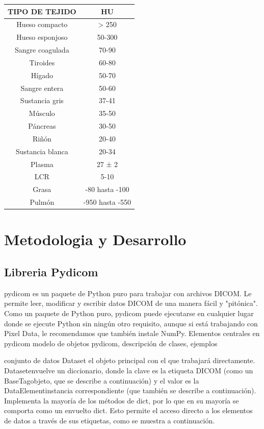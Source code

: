 \documentclass{article}
\begin{document}
\begin{table}[H]
\begin{center}
\begin{tabular}{| c | c |}
\hline
TIPO DE TEJIDO & HU \\ \hline
Hueso compacto & > 250 \\
Hueso esponjoso & 50-300 \\
Sangre coagulada & 70-90 \\
Tiroides & 60-80\\
Hígado & 50-70\\
Sangre entera & 50-60\\
Sustancia gris & 37-41\\
Músculo & 35-50\\
Páncreas & 30-50\\
Riñón & 20-40\\
Sustancia blanca & 20-34\\
Plasma & 27 ± 2\\
LCR & 5-10\\
Grasa & -80 hasta -100\\
Pulmón & -950 hasta -550\\ \hline
\end{tabular}
\end{center}
\end{table}


\section{Metodologia y Desarrollo}

\subsection{Libreria Pydicom}
pydicom es un paquete de Python puro para trabajar con archivos DICOM. Le permite leer, modificar y escribir datos DICOM de una manera fácil y "pitónica".
Como un paquete de Python puro, pydicom puede ejecutarse en cualquier lugar donde se ejecute Python sin ningún otro requisito, aunque si está trabajando con Pixel Data, le recomendamos que también instale NumPy.
Elementos centrales en pydicom
modelo de objetos pydicom, descripción de clases, ejemplos

conjunto de datos
Dataset el objeto principal con el que trabajará directamente. Datasetenvuelve un diccionario, donde la clave es la etiqueta DICOM (como un BaseTagobjeto, que se describe a continuación) y el valor es la DataElementinstancia correspondiente (que también se describe a continuación). Implementa la mayoría de los métodos de dict, por lo que en su mayoría se comporta como un envuelto dict. Esto permite el acceso directo a los elementos de datos a través de sus etiquetas, como se muestra a continuación.
\end{document}

